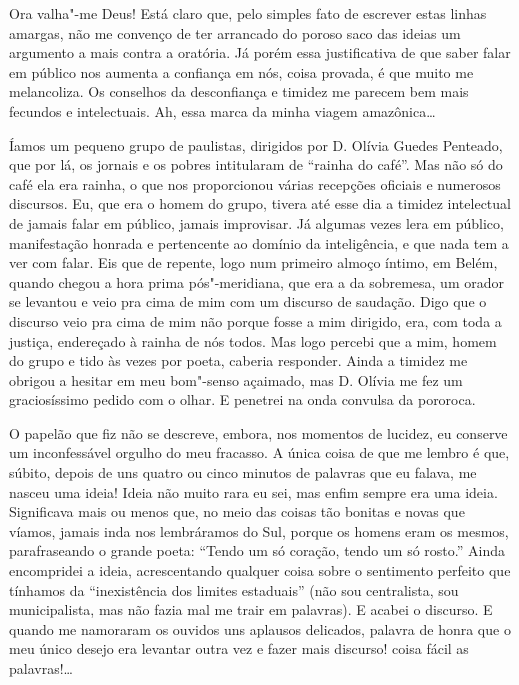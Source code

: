 Ora valha"-me Deus! Está claro que, pelo simples fato de escrever estas
linhas amargas, não me convenço de ter arrancado do poroso saco das
ideias um argumento a mais contra a oratória. Já porém essa
justificativa de que saber falar em público nos aumenta a confiança em
nós, coisa provada, é que muito me melancoliza. Os conselhos da
desconfiança e timidez me parecem bem mais fecundos e intelectuais. Ah,
essa marca da minha viagem amazônica\ldots{}

Íamos um pequeno grupo de paulistas, dirigidos por D. Olívia Guedes
Penteado, que por lá, os jornais e os pobres intitularam de ``rainha do
café''. Mas não só do café ela era rainha, o que nos proporcionou várias
recepções oficiais e numerosos discursos. Eu, que era o homem do grupo,
tivera até esse dia a timidez intelectual de jamais falar em público,
jamais improvisar. Já algumas vezes lera em público, manifestação
honrada e pertencente ao domínio da inteligência, e que nada tem a ver
com falar. Eis que de repente, logo num primeiro almoço íntimo, em
Belém, quando chegou a hora prima pós"-meridiana, que era a da sobremesa,
um orador se levantou e veio pra cima de mim com um discurso de
saudação. Digo que o discurso veio pra cima de mim não porque fosse a
mim dirigido, era, com toda a justiça, endereçado à rainha de nós todos.
Mas logo percebi que a mim, homem do grupo e tido às vezes por poeta,
caberia responder. Ainda a timidez me obrigou a hesitar em meu bom"-senso
açaimado, mas D. Olívia me fez um graciosíssimo pedido com o olhar. E
penetrei na onda convulsa da pororoca.

O papelão que fiz não se descreve, embora, nos momentos de lucidez, eu
conserve um inconfessável orgulho do meu fracasso. A única coisa de que
me lembro é que, súbito, depois de uns quatro ou cinco minutos de
palavras que eu falava, me nasceu uma ideia! Ideia não muito rara eu
sei, mas enfim sempre era uma ideia. Significava mais ou menos que, no
meio das coisas tão bonitas e novas que víamos, jamais inda nos
lembráramos do Sul, porque os homens eram os mesmos, parafraseando o
grande poeta: ``Tendo um só coração, tendo um só rosto.'' Ainda
encompridei a ideia, acrescentando qualquer coisa sobre o sentimento
perfeito que tínhamos da ``inexistência dos limites estaduais'' (não sou
centralista, sou municipalista, mas não fazia mal me trair em palavras).
E acabei o discurso. E quando me namoraram os ouvidos uns aplausos
delicados, palavra de honra que o meu único desejo era levantar outra
vez e fazer mais discurso! coisa fácil as palavras!\ldots{}

